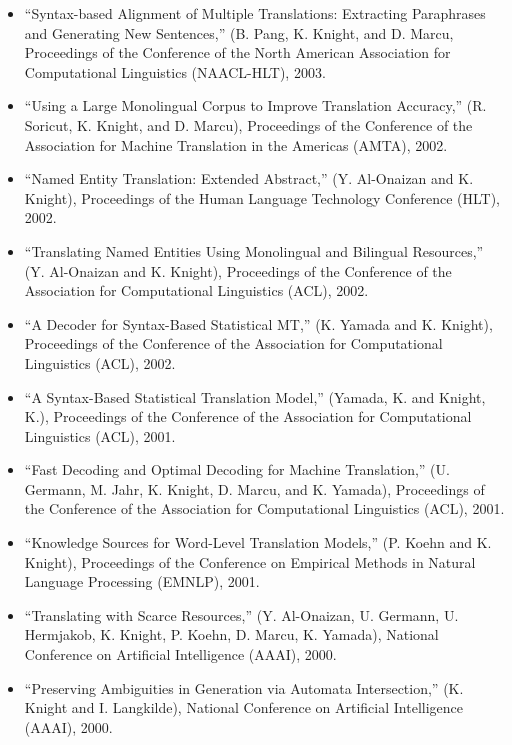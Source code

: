 \begin{itemize}
\item ``Syntax-based Alignment of Multiple Translations:
Extracting Paraphrases and Generating New Sentences,''
(B. Pang, K. Knight, and D. Marcu, 
Proceedings of the Conference of the 
North American Association for Computational Linguistics (NAACL-HLT), 
2003.

\item ``Using a Large Monolingual Corpus to Improve Translation Accuracy,'' 
(R. Soricut, K. Knight, and D. Marcu), 
Proceedings of the Conference of the Association for Machine
Translation in the Americas (AMTA), 2002.

\item ``Named Entity Translation: Extended Abstract,'' (Y. Al-Onaizan and K. 
Knight), Proceedings of the Human Language Technology Conference (HLT), 2002. 

\item ``Translating Named Entities Using Monolingual and Bilingual 
Resources,'' (Y. Al-Onaizan and K. Knight), Proceedings of the Conference of 
the Association for Computational Linguistics (ACL), 2002. 

\item ``A Decoder for Syntax-Based Statistical MT,'' (K. Yamada and K. 
Knight), Proceedings of the Conference of the Association for Computational 
Linguistics (ACL), 2002. 

\item ``A Syntax-Based Statistical Translation Model,'' (Yamada, K. and 
Knight, K.), 
Proceedings of the Conference of the 
Association for Computational Linguistics (ACL), 
2001.

\item ``Fast Decoding and Optimal Decoding for Machine Translation,''
(U. Germann, M. Jahr, K. Knight, D. Marcu, and K. Yamada),
Proceedings of the Conference of the 
Association for Computational Linguistics (ACL), 2001.

\item ``Knowledge Sources for Word-Level Translation Models,''
(P. Koehn and K. Knight), Proceedings of the Conference on
Empirical Methods in Natural Language Processing (EMNLP), 2001.

\item ``Translating with Scarce Resources,'' (Y. Al-Onaizan, 
U. Germann, U. Hermjakob, K. Knight, P. Koehn, D. Marcu, K. Yamada),
National Conference on Artificial Intelligence (AAAI), 2000. 

\item ``Preserving Ambiguities in Generation via Automata Intersection,'' 
(K. Knight and I. Langkilde), National Conference on Artificial
Intelligence (AAAI), 2000. 


\end{itemize}
